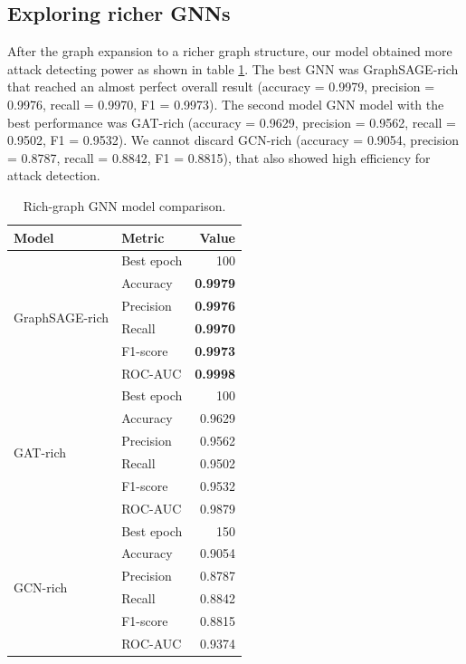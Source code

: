 \documentclass[final,5p,times,twocolumn]{elsarticle}
\begin{document}
\subsection{Exploring richer GNNs}
\label{Exploring richer GNNs}
After the graph expansion to a richer graph structure, our model obtained more attack detecting power as shown in table \ref{tab:rich_gnn_performance_vertical}. The best GNN was GraphSAGE-rich that reached an almost perfect overall result (accuracy = 0.9979, precision = 0.9976, recall = 0.9970, F1 = 0.9973). The second model GNN model with the best performance was GAT-rich (accuracy = 0.9629, precision = 0.9562, recall = 0.9502, F1 = 0.9532). We cannot discard GCN-rich (accuracy = 0.9054, precision = 0.8787, recall = 0.8842, F1 = 0.8815), that also showed high efficiency for attack detection.


\begin{table}[H]
\caption{Rich-graph GNN model comparison.}
\centering
\scriptsize
\renewcommand{\arraystretch}{1.15}
\begin{tabular}{llr}
\toprule
\textbf{Model} & \textbf{Metric} & \textbf{Value} \\
\midrule

\multirow{6}{*}{GraphSAGE-rich}
& Best epoch & 100 \\
& Accuracy & \textbf{0.9979} \\
& Precision & \textbf{0.9976} \\
& Recall & \textbf{0.9970} \\
& F1-score & \textbf{0.9973} \\
& ROC-AUC & \textbf{0.9998} \\
\midrule

\multirow{6}{*}{GAT-rich}
& Best epoch & 100 \\
& Accuracy & 0.9629 \\
& Precision & 0.9562 \\
& Recall & 0.9502 \\
& F1-score & 0.9532 \\
& ROC-AUC & 0.9879 \\
\midrule

\multirow{6}{*}{GCN-rich}
& Best epoch & 150 \\
& Accuracy & 0.9054 \\
& Precision & 0.8787 \\
& Recall & 0.8842 \\
& F1-score & 0.8815 \\
& ROC-AUC & 0.9374 \\
\bottomrule
\end{tabular}
\label{tab:rich_gnn_performance_vertical}
\end{table}
\end{document}
